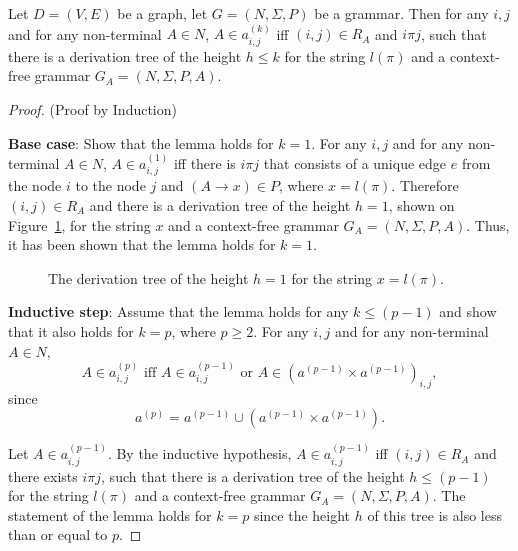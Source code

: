 \begin{lemma}\label{lemma:cf}
Let $D = (V,E)$ be a graph, let $G =(N,\Sigma,P)$ be a grammar. Then for any $i, j$ and for any non-terminal $A \in N$, $A \in a^{(k)}_{i,j}$ iff $(i,j) \in R_A$ and $i \pi j$, such that there is a derivation tree of the height $h \leq k$ for the string $l(\pi)$ and a context-free grammar $G_A = (N,\Sigma,P,A)$.
\end{lemma}
\begin{proof}(Proof by Induction)

\textbf{Base case}: Show that the lemma holds for $k = 1$. For any $i, j$ and for any non-terminal $A \in N$, $A \in a^{(1)}_{i,j}$ iff there is $i \pi j$ that consists of a unique edge $e$ from the node $i$ to the node $j$ and $(A \rightarrow x) \in P$, where $x = l(\pi)$. Therefore $(i,j) \in R_A$ and there is a derivation tree of the height $h = 1$, shown on Figure~\ref{tree1}, for the string $x$ and a context-free grammar $G_A = (N,\Sigma,P,A)$. Thus, it has been shown that the lemma holds for $k = 1$.

\begin{figure}[h!]
	\centering
	\caption{The derivation tree of the height $h = 1$ for the string $x = l(\pi)$.}
	\label{tree1}
\end{figure}

\textbf{Inductive step}: Assume that the lemma holds for any $k \leq (p - 1)$ and show that it also holds for $k = p$, where $p \geq 2$. For any $i, j$ and for any non-terminal $A \in N$, $$A \in a^{(p)}_{i,j} \text{ iff } A \in a^{(p-1)}_{i,j} \text{ or } A \in (a^{(p-1)} \times a^{(p-1)})_{i,j},$$ since $$a^{(p)} = a^{(p-1)} \cup (a^{(p-1)} \times a^{(p-1)}).$$

Let $A \in a^{(p-1)}_{i,j}$. By the inductive hypothesis, $A \in a^{(p-1)}_{i,j}$ iff $(i,j) \in R_A$ and there exists $i \pi j$, such that there is a derivation tree of the height $h \leq (p-1)$ for the string $l(\pi)$ and a context-free grammar $G_A = (N,\Sigma,P,A)$. The statement of the lemma holds for $k = p$ since the height $h$ of this tree is also less than or equal to $p$.


\end{proof}
